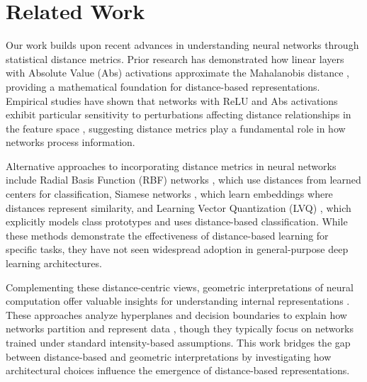 \section{Related Work}
\label{sec:related_work}
Our work builds upon recent advances in understanding neural networks through statistical distance metrics. Prior research has demonstrated how linear layers with Absolute Value (Abs) activations approximate the Mahalanobis distance \cite{mahalanobis1936generalized, oursland2024interpreting}, providing a mathematical foundation for distance-based representations. Empirical studies have shown that networks with ReLU and Abs activations exhibit particular sensitivity to perturbations affecting distance relationships in the feature space \cite{oursland2024neural}, suggesting distance metrics play a fundamental role in how networks process information.

Alternative approaches to incorporating distance metrics in neural networks include Radial Basis Function (RBF) networks \cite{broomhead1988radial}, which use distances from learned centers for classification, Siamese networks \cite{bromley1994signature}, which learn embeddings where distances represent similarity, and Learning Vector Quantization (LVQ) \cite{kohonen1995learning}, which explicitly models class prototypes and uses distance-based classification. While these methods demonstrate the effectiveness of distance-based learning for specific tasks, they have not seen widespread adoption in general-purpose deep learning architectures.

Complementing these distance-centric views, geometric interpretations of neural computation offer valuable insights for understanding internal representations \cite{montavon2018methods, olah2017feature, samek2019explainable}. These approaches analyze hyperplanes and decision boundaries to explain how networks partition and represent data \cite{lipton2018mythos, erhan2009visualizing}, though they typically focus on networks trained under standard intensity-based assumptions. This work bridges the gap between distance-based and geometric interpretations by investigating how architectural choices influence the emergence of distance-based representations.
